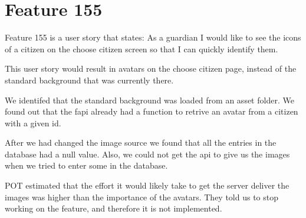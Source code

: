 \section{Feature 155}
Feature 155 is a user story that states: As a guardian I would like to see the icons of a citizen on the choose citizen screen so that I can quickly identify them.

This user story would result in avatars on the choose citizen page, instead of the standard background that was currently there.

We identifed that the standard background was loaded from an asset folder. We found out that the \gls{fapi} already had a function to retrive an avatar from a citizen with a given id.

After we had changed the image source we found that all the entries in the database had a null value. Also, we could not get the \gls{api} to give us the images when we tried to enter some in the database.%

\gls{POT} estimated that the effort it would likely take to get the server deliver the images was higher than the importance of the avatars. They told us to stop working on the feature, and therefore it is not implemented.
